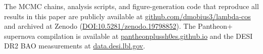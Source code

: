 \documentclass[
  aps,
  prd,
  onecolumn,         %
  nofootinbib,
  longbibliography
]{revtex4-2}
\begin{document}
The MCMC chains, analysis scripts, and figure-generation code that
reproduce all results in this paper are publicly available at
\href{https://github.com/dmobius3/lambda-cos}{github.com/dmobius3/lambda-cos}
and archived at Zenodo
(\href{https://doi.org/10.5281/zenodo.19798852}{DOI:10.5281/zenodo.19798852}).
The Pantheon+ supernova compilation \cite{ref2} is available at
\href{https://pantheonplussh0es.github.io/}{pantheonplussh0es.github.io}
and the DESI DR2 BAO measurements \cite{ref1} at
\href{https://data.desi.lbl.gov/}{data.desi.lbl.gov}.

\pagebreak

\FloatBarrier      %


\end{document}
